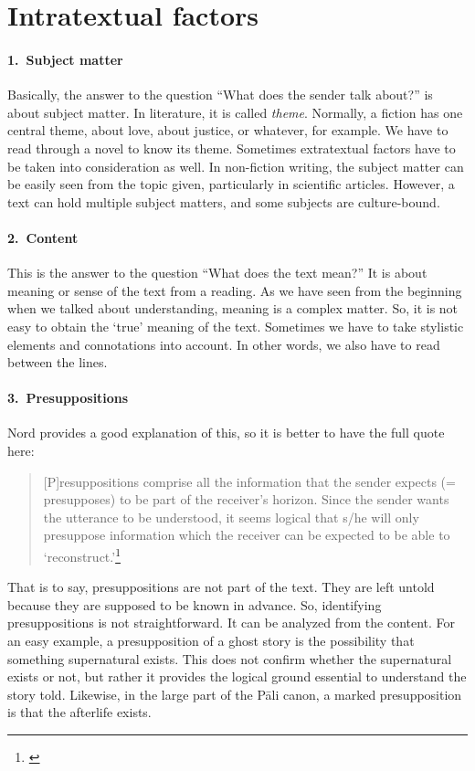 {}
\section*{Intratextual factors}

\paragraph*{1.\ Subject matter} Basically, the answer to the question ``What does the sender talk about?'' is about subject matter. In literature, it is called \emph{theme}. Normally, a fiction has one central theme, about love, about justice, or whatever, for example. We have to read through a novel to know its theme. Sometimes extratextual factors have to be taken into consideration as well. In non-fiction writing, the subject matter can be easily seen from the topic given, particularly in scientific articles. However, a text can hold multiple subject matters, and some subjects are culture-bound.

\paragraph*{2.\ Content} This is the answer to the question ``What does the text mean?'' It is about meaning or sense of the text from a reading. As we have seen from the beginning when we talked about understanding, meaning is a complex matter. So, it is not easy to obtain the `true' meaning of the text. Sometimes we have to take stylistic elements and connotations into account. In other words, we also have to read between the lines.

\paragraph*{3.\ Presuppositions} Nord provides a good explanation of this, so it is better to have the full quote here:

\begin{quote}
[P]resuppositions comprise all the information that the sender expects (= presupposes) to be part of the receiver's horizon. Since the sender wants the utterance to be understood, it seems logical that s/he will only presuppose information which the receiver can be expected to be able to `reconstruct.'\footnote{\citealp[p.~106]{nord:analysis}}
\end{quote}

That is to say, presuppositions are not part of the text. They are left untold because they are supposed to be known in advance. So, identifying presuppositions is not straightforward. It can be analyzed from the content. For an easy example, a presupposition of a ghost story is the possibility that something supernatural exists. This does not confirm whether the supernatural exists or not, but rather it provides the logical ground essential to understand the story told. Likewise, in the large part of the P\=ali canon, a marked presupposition is that the afterlife exists.

